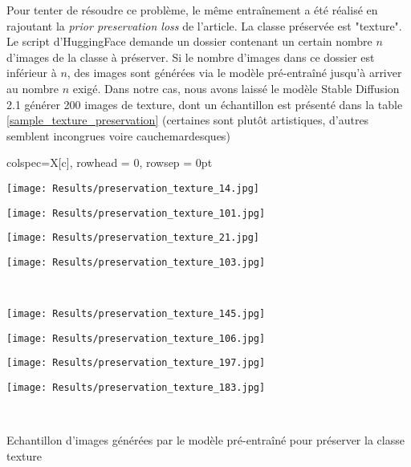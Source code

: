 \documentclass{article}
\begin{document}
\vspace{-0.5cm}
Pour tenter de résoudre ce problème, le même entraînement a été réalisé en rajoutant la \textit{prior preservation loss} de l'article. La classe préservée est "texture". Le script d'HuggingFace demande un dossier contenant un certain nombre $n$ d'images de la classe à préserver. Si le nombre d'images dans ce dossier est inférieur à $n$, des images sont générées via le modèle pré-entraîné jusqu'à arriver au nombre $n$ exigé. Dans notre cas, nous avons laissé le modèle Stable Diffusion 2.1 générer 200 images de texture, dont un échantillon est présenté dans la table \ref{sample_texture_preservation} (certaines sont plutôt artistiques, d'autres semblent incongrues voire cauchemardesques)
\begin{table}[H]
    \centering
    \begin{tblr}{colspec={X[c]},
    rowhead = 0,
    rowsep = 0pt
    }
    \begin{minipage}{0.2\textwidth}
    \texttt{[image: Results/preservation\_texture\_14.jpg]}
    \end{minipage}
    \hspace{-0.25cm}
    \begin{minipage}{0.2\textwidth}
    \texttt{[image: Results/preservation\_texture\_101.jpg]}
    \end{minipage}
    \hspace{-0.25cm}
    \begin{minipage}{0.2\textwidth}
    \texttt{[image: Results/preservation\_texture\_21.jpg]}
    \end{minipage}
    \hspace{-0.25cm}
    \begin{minipage}{0.2\textwidth}
    \texttt{[image: Results/preservation\_texture\_103.jpg]}
    \end{minipage}\\
    \begin{minipage}{0.2\textwidth}
    \texttt{[image: Results/preservation\_texture\_145.jpg]}
    \end{minipage}
    \hspace{-0.25cm}
    \begin{minipage}{0.2\textwidth}
    \texttt{[image: Results/preservation\_texture\_106.jpg]}
    \end{minipage}
    \hspace{-0.25cm}
    \begin{minipage}{0.2\textwidth}
    \texttt{[image: Results/preservation\_texture\_197.jpg]}
    \end{minipage}
    \hspace{-0.25cm}
    \begin{minipage}{0.2\textwidth}
    \texttt{[image: Results/preservation\_texture\_183.jpg]}
    \end{minipage}\\
    \end{tblr}
    \caption{Echantillon d'images générées par le modèle pré-entraîné pour préserver la classe texture}
    \label{sample_texture_preservation}
\end{table}
\end{document}
